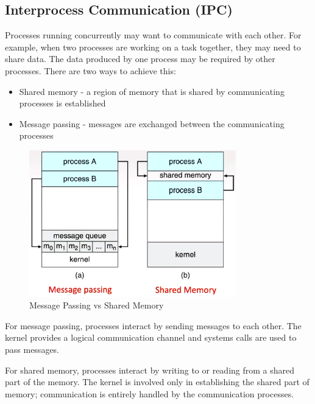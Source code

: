 \documentclass[a4paper]{article}
\theoremstyle{plain}
\theoremstyle{definition}
\newtheorem{defn}{Definition}[section]
\theoremstyle{remark}
\begin{document}
\subsection{Interprocess Communication (IPC)}
\begin{tcolorbox}[colback=black!3!white,colframe=black!60!white,title=\begin{defn}Interprocess Communication (IPC) \label{Interprocess Communication (IPC)}\end{defn}]
Processes running concurrently may want to communicate with each other. For example, when two processes are working on a task together, they may need to share data. The data produced by one process may be required by other processes. There are two ways to achieve this:
\begin{itemize}
	\item Shared memory - a region of memory that is shared by communicating processes is established
	\item Message passing - messages are exchanged between the communicating processes
\end{itemize}
\begin{figure}[H]
	\centering
	\includegraphics[width=0.8\textwidth]{ten.png}
	\caption{Message Passing vs Shared Memory}
	\label{fig:ten-png}
\end{figure}
For message passing, processes interact by sending messages to each other. The kernel provides a logical communication channel and systems calls are used to pass messages. 

For shared memory, processes interact by writing to or reading from a shared part of the memory. The kernel is involved only in establishing the shared part of memory; communication is entirely handled by the communication processes.
\end{tcolorbox}
\end{document}
